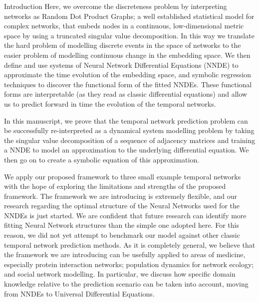 \documentclass[12pt]{amsart}
\begin{document}
\begin{section}{Introduction}
    Here, we overcome the discreteness problem by interpreting networks as Random Dot Product Graphs; a well established statistical model for complex networks, that embeds nodes in a continuous, low-dimensional metric space by using a truncated singular value decomposition\cite{athreya2017statistical}. In this way we translate the hard problem of modelling discrete events in the space of networks to the easier problem of modelling continuous change in the embedding space. We then define and use systems of Neural Network Differential Equations (NNDE)\cite{SciML_C_Rak} to approximate the time evolution of the embedding space, and symbolic regression techniques to discover the functional form of the fitted NNDEs. These functional forms are interpretable (as they read as classic differential equations) and allow us to predict forward in time the evolution of the temporal networks.

    In this manuscript, we prove that the temporal network prediction problem can be successfully re-interpreted as a dynamical system modelling problem by taking the singular value decomposition of a sequence of adjacency matrices and training a NNDE to model an approximation to the underlying differential equation. We then go on to create a symbolic equation of this approximation. 

    We apply our proposed framework to three small example temporal networks with the hope of exploring the limitations and strengths of the proposed framework. 
    The framework we are introducing is extremely flexible, and our research regarding the optimal structure of the Neural Networks used for the NNDEs is just started.
    We are confident that future research can identify more fitting Neural Network structures than the simple one adopted here.
    For this reason, we did not yet attempt to benchmark our model against other classic temporal network prediction methods.
    As it is completely general, we believe that the framework we are introducing can be usefully applied to areas of medicine, especially protein interaction networks; population dynamics for network ecology; and social network modelling. In particular, we discuss how specific domain knowledge relative to the prediction scenario can be taken into account, moving from NNDEs to Universal Differential Equations.
\end{section}
\end{document}
